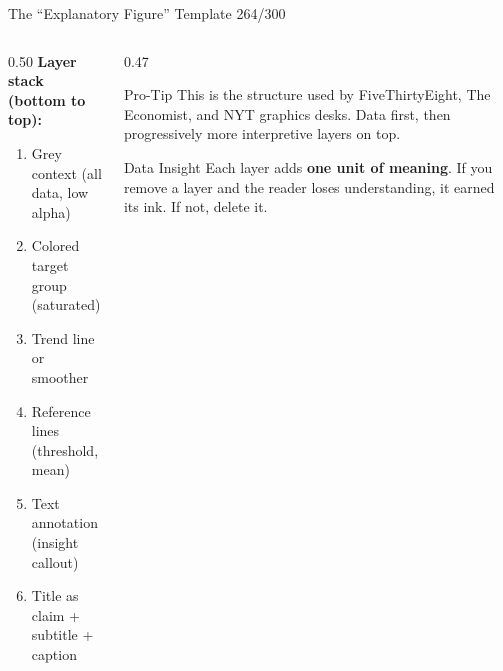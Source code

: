 \documentclass[10pt]{beamer}
\newcommand{\smark}[1]{\hfill{\scriptsize\color{codegray}#1}}
\begin{document}
\begin{frame}{The ``Explanatory Figure'' Template}
\smark{264/300}
\begin{columns}[T]
\begin{column}{0.50\textwidth}
    \textbf{Layer stack (bottom to top):}
    \begin{enumerate}
        \item Grey context (all data, low alpha)
        \item Colored target group (saturated)
        \item Trend line or smoother
        \item Reference lines (threshold, mean)
        \item Text annotation (insight callout)
        \item Title as claim + subtitle + caption
    \end{enumerate}
\end{column}
\begin{column}{0.47\textwidth}
\begin{alertblock}{Pro-Tip}
    \scriptsize This is the structure used by FiveThirtyEight, The Economist, and NYT graphics desks. Data first, then progressively more interpretive layers on top.
\end{alertblock}
\vspace{0.2cm}
\begin{exampleblock}{Data Insight}
    \scriptsize Each layer adds \textbf{one unit of meaning}. If you remove a layer and the reader loses understanding, it earned its ink. If not, delete it.
\end{exampleblock}
\end{column}
\end{columns}
\end{frame}
\end{document}

